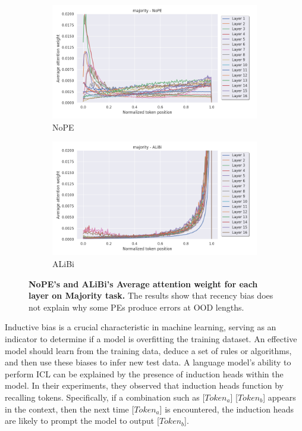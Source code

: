 \documentclass[letterpaper]{article} %
\begin{document}
\begin{figure}[tp]
    \begin{subfigure}[t]{0.48\linewidth}
        \includegraphics[width=\linewidth]{AnonymousSubmission/LaTeX/imgs/analysis/nope_majority.png}
        \caption{NoPE}
    \end{subfigure}
    \begin{subfigure}[t]{0.48\linewidth}
        \includegraphics[width=\linewidth]{AnonymousSubmission/LaTeX/imgs/analysis/alibi_majority.png}
        \caption{ALiBi}
    \end{subfigure}
    \caption{\small\textbf{NoPE's and ALiBi's Average attention weight for each layer on Majority task.} The results show that recency bias does not explain why some PEs produce errors at OOD lengths.}
    \label{fig:recency_ma}
\end{figure}

Inductive bias is a crucial characteristic in machine learning, serving as an indicator to determine if a model is overfitting the training dataset. An effective model should learn from the training data, deduce a set of rules or algorithms, and then use these biases to infer new test data. A language model's ability to perform ICL can be explained by the presence of induction heads \cite{olsson-2022-context} within the model. In their experiments, they observed that induction heads function by recalling tokens. Specifically, if a combination such as [$Token_a$] [$Token_b$] appears in the context, then the next time [$Token_a$] is encountered, the induction heads are likely to prompt the model to output [$Token_b$].
\end{document}
